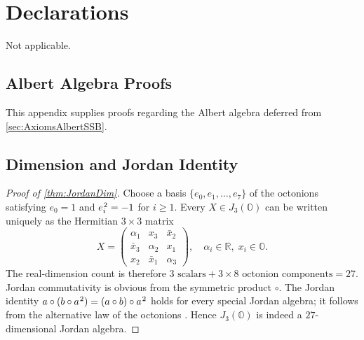 \documentclass[pdflatex,sn-mathphys-num]{sn-jnl}
\theoremstyle{thmstyleone}
\theoremstyle{thmstyletwo}%
\theoremstyle{thmstylethree}%
\newcommand{\Oct}{\mathbb{O}}
\newcommand{\jalg}{J_3(\mathbb{O})}
\newcommand{\sm}{\hspace{.065em}}
\newcommand{\smexp}[1]{^{\sm #1}}
\begin{document}
\section*{Declarations}

Not applicable.

\begin{appendices}


\appendix

\section{Albert Algebra Proofs}
\label{app:Albert}

This appendix supplies proofs regarding the Albert algebra deferred from \autoref{sec:AxiomsAlbertSSB}.

\subsection{Dimension and Jordan Identity}
\label{app:Albert:JordanDim}

\begin{proof}[Proof of \autoref{thm:JordanDim}]
Choose a basis $\{e_{0},e_{1},\dots,e_{7}\}$ of the octonions satisfying $e_{0}=1$ and $e_{i}\smexp{2}=-1$ for $i\ge1$.  
Every $X\in\jalg$ can be written uniquely as the Hermitian $3\times3$ matrix
\[
  X=\begin{pmatrix}
        \alpha_{1} & x_{3} & \bar x_{2}\\
        \bar x_{3} & \alpha_{2} & x_{1}\\
        x_{2} & \bar x_{1} & \alpha_{3}
      \end{pmatrix},
  \quad
  \alpha_{i}\in\mathbb R,
  \;
  x_{i}\in\Oct.
\]
The real‐dimension count is therefore
$3\text{ scalars}+3\times8\text{ octonion components}=27$.
Jordan commutativity is obvious from the symmetric product $\circ$.  
The Jordan identity
$a\circ(b\circ a\smexp{2})=(a\circ b)\circ a\smexp{2}$
holds for every special Jordan algebra; it follows from the alternative law of the octonions \cite{McCrimmon:2004}.  Hence $\jalg$ is indeed a $27$-dimensional Jordan algebra.
\end{proof}


\end{appendices}
\end{document}
